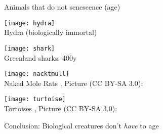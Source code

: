 \begin{frame}[c]{Animals that do not senescence (age)}
    \scriptsize
    \begin{multicols}{2}
        \texttt{[image: hydra]} \\
        Hydra (biologically immortal) \cite{martinez1998mortality} \\
        \pause

        \texttt{[image: shark]} \\
        Greenland sharks: 400y \cite{Greenlan67:online} \\
        \pause

        \texttt{[image: nacktmull]} \\
        Naked Mole Rats \cite{ruby2018naked},
        Picture (CC BY-SA 3.0): \cite{Nacktmul31:online} \\
        \pause

        \texttt{[image: turtoise]} \\
        Tortoises \cite{miller2001escaping},
        Picture (CC BY-SA 3.0): \cite{Tortoise98:online} \\
    \end{multicols}
    \pause
    \normalsize
    Conclusion: Biological creatures don't {\em have} to age
\end{frame}



